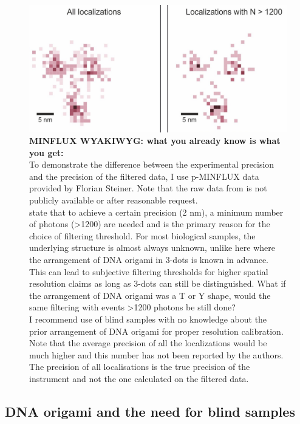 \documentclass[9pt,twocolumn,twoside]{pnas-new}
\begin{document}
\begin{figure}
\begin{center}
\includegraphics[width=\linewidth]{Figures/pmin}
\end{center}
\caption[]{\textbf{MINFLUX WYAKIWYG: what you already know is what you get:} \\
To demonstrate the difference between the experimental precision and the precision of the filtered data, I use p-MINFLUX data \citep{masullo2020pulsed} provided by Florian Steiner.  Note that the raw data from \cite{gwosch2020minflux} is not publicly available or after reasonable request. \\
 \cite{masullo2020pulsed} state that to achieve a certain precision (2 nm), a minimum number of photons (>1200) are needed and is the primary reason for the choice of filtering threshold. For most biological samples, the underlying structure is almost always unknown, unlike here where the arrangement of DNA origami in 3-dots is known in advance.  This can lead to subjective filtering thresholds for higher spatial resolution claims as long as 3-dots can still be distinguished. What if the arrangement of DNA origami was a T or Y shape, would the same filtering with events >1200 photons be still done?\\
I recommend use of blind samples with no knowledge about the prior arrangement of DNA origami for proper resolution calibration.\\ 
Note that the average precision of all the localizations would be much higher and this number has not been reported by the authors. The precision of all localisations is the true precision of the instrument and not the one calculated on the filtered data.\\
} \label{fig:pminflux}
\end{figure}

\subsection{DNA origami and the need for blind samples}
\end{document}
